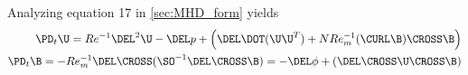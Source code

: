 \documentclass[11pt]{article}
\newcommand{\ReInv}{Re^{-1}}
\newcommand{\RemInv}{Re_m^{-1}}
\newcommand{\Al}{N Re_m^{-1}}
\begin{document}
Analyzing equation 17 in \ref{sec:MHD_form} yields
\begin{equation}\begin{aligned}
  \PD_t \U = \ReInv \DEL^2 \U - \DEL p + \left( \DEL \DOT (\U \U^T) + \Al (\CURL \B) \CROSS \B \right) \\
  \PD_t \B = -\RemInv \DEL \CROSS ( \SO^{-1} \DEL \CROSS \B ) = -\DEL \phi + \left( \DEL \CROSS \U \CROSS \B \right) \\
\end{aligned}\end{equation}
\end{document}
